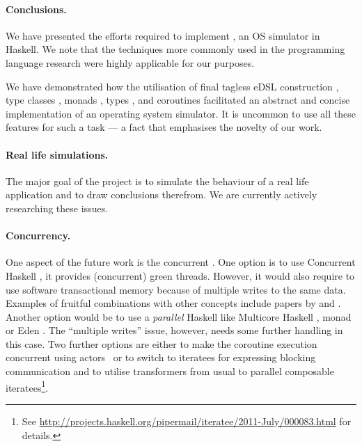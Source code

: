 \paragraph{Conclusions.}
We have presented the efforts required to implement \soosim, an OS simulator in Haskell.
We note that the techniques more commonly used in the programming language research were highly applicable for our purposes.

We have demonstrated how the utilisation of final tagless eDSL construction \cite{final_tagless_embedding,Hofer:2008:PED:1449913.1449935}, type classes \cite{Hall:1996:TCH:227699.227700}, monads \cite{Wadler:1990:CM:91556.91592},  types \cite{Abadi:1991:DTS:103135.103138}, and coroutines \cite{coroutines,cmt} facilitated an abstract and concise implementation of an operating system simulator.
It is uncommon to use all these features for such a task --- a fact that emphasises the novelty of our work.

\paragraph{Real life simulations.}
The major goal of the project is to simulate the behaviour of a real life application and to draw conclusions therefrom.
We are currently actively researching these issues.

\paragraph{Concurrency.}
One aspect of the future work is the concurrent \soosim.
One option is to use Concurrent Haskell \cite{ConcHs}, it provides (concurrent) green threads.
However, it would also require to use software transactional memory \cite{springerlink:10.1007/s004460050028} because of multiple writes to the same data.
Examples of fruitful combinations with other concepts include papers by \citeauthor{Harris:2008:CMT:1378704.1378725} \cite{Harris:2008:CMT:1378704.1378725} and \citeauthor{Bieniusa:2010:BAA:1835698.1835714} \cite{Bieniusa:2010:BAA:1835698.1835714,springerlink:10.1007/978-3-642-25959-3_2}.
Another option would be to use a \emph{parallel} Haskell like Multicore Haskell \cite{marlow:rsm},  monad \cite{par-monad} or Eden \cite{eden}.
The ``multiple writes'' issue, however, needs some further handling in this case.
Two further options are either to make the coroutine execution concurrent using actors~\cite{Hewitt:1973:UMA:1624775.1624804,sulzmann2008actors} or to switch to iteratees for expressing blocking communication and to utilise transformers from usual to parallel composable iteratees\footnote{See \url{http://projects.haskell.org/pipermail/iteratee/2011-July/000083.html} for details.}.

